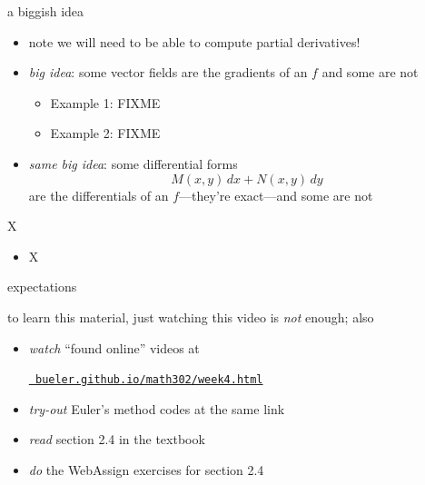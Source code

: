 \documentclass{beamer}
\begin{document}
\begin{frame}{a biggish idea}

\begin{itemize}
\item note we will need to be able to compute partial derivatives!
\item \emph{big idea}: some vector fields are the gradients of an $f$ and some are not
    \begin{itemize}
    \item Example 1: FIXME
    \item Example 2: FIXME
    \end{itemize}
\item \emph{same big idea}: some differential forms
    $$M(x,y)\,dx + N(x,y)\,dy$$
are the differentials of an $f$---they're \alert{exact}---and some are not
\end{itemize}
\end{frame}


\begin{frame}{X}

\begin{itemize}
\item X
\end{itemize}
\end{frame}


\begin{frame}{expectations}

to learn this material, just watching this video is \emph{not} enough; also
\begin{itemize}
\item \emph{watch} ``found online'' videos at

\centerline{\href{https://bueler.github.io/math302/week4.html}{\tt \color{cyan} bueler.github.io/math302/week4.html}}
\item \emph{try-out} Euler's method codes at the same link
\item \emph{read} section 2.4 in the textbook
\item \emph{do} the WebAssign exercises for section 2.4
\end{itemize}
\end{frame}
\end{document}

